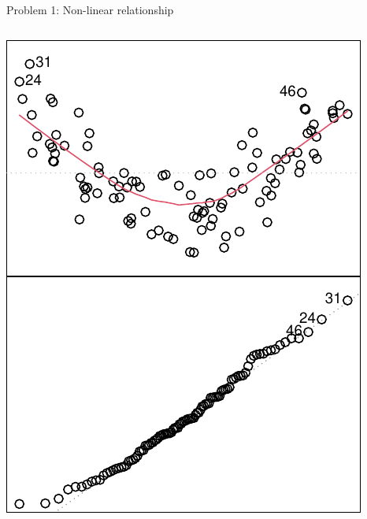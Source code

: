 \documentclass[
  ignorenonframetext,
  aspectratio=169]{beamer}
\begin{document}
\begin{frame}[fragile]{Problem 1: Non-linear relationship}
\begin{columns}[T]
\begin{column}{0.48\textwidth}
\includegraphics{03-Lecture_files/figure-beamer/unnamed-chunk-29-1.pdf}
\end{column}
\end{columns}
\end{frame}
\end{document}
